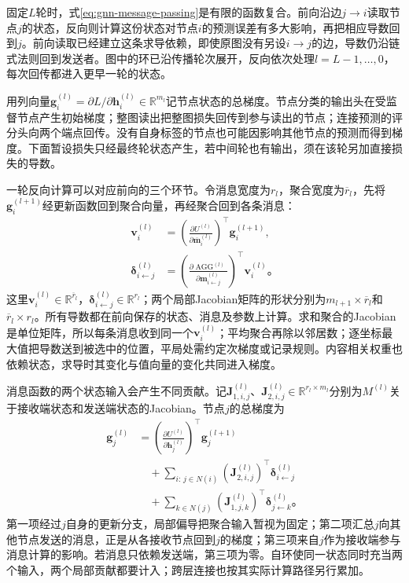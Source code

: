 固定$L$轮时，式\eqref{eq:gnn-message-passing}是有限的函数复合。前向沿边$j\to i$读取节点$j$的状态，反向则计算这份状态对节点$i$的预测误差有多大影响，再把相应导数回到$j$。前向读取已经建立这条求导依赖，即使原图没有另设$i\to j$的边，导数仍沿链式法则回到发送者。图中的环已沿传播轮次展开，反向依次处理$l=L-1,\ldots,0$，每次回传都进入更早一轮的状态。

用列向量$\bm{g}_i^{(l)}=\partial L/\partial\bm{h}_i^{(l)}\in\mathbb{R}^{m_l}$记节点状态的总梯度。节点分类的输出头在受监督节点产生初始梯度；整图读出把整图损失回传到参与读出的节点；连接预测的评分头向两个端点回传。没有自身标签的节点也可能因影响其他节点的预测而得到梯度。下面暂设损失只经最终轮状态产生，若中间轮也有输出，须在该轮另加直接损失的导数。

一轮反向计算可以对应前向的三个环节。令消息宽度为$r_l$，聚合宽度为$\overline r_l$，先将$\bm{g}_i^{(l+1)}$经更新函数回到聚合向量，再经聚合回到各条消息：
\begin{equation}
  \begin{aligned}
    \bm{v}_i^{(l)}
      &=\left(\frac{\partial U^{(l)}}
        {\partial\overline{\bm{m}}_i^{(l)}}\right)^{\top}
        \bm{g}_i^{(l+1)},\\
    \bm{\delta}_{i\leftarrow j}^{(l)}
      &=\left(\frac{\partial\operatorname{AGG}^{(l)}}
        {\partial\bm{m}_{i\leftarrow j}^{(l)}}\right)^{\top}
        \bm{v}_i^{(l)}\text{。}
  \end{aligned}
  \label{eq:gnn-message-adjoints}
\end{equation}
这里$\bm{v}_i^{(l)}\in\mathbb{R}^{\overline r_l}$，$\bm{\delta}_{i\leftarrow j}^{(l)}\in\mathbb{R}^{r_l}$；两个局部Jacobian矩阵的形状分别为$m_{l+1}\times\overline r_l$和$\overline r_l\times r_l$。所有导数都在前向保存的状态、消息及参数上计算。求和聚合的Jacobian是单位矩阵，所以每条消息收到同一个$\bm{v}_i^{(l)}$；平均聚合再除以邻居数；逐坐标最大值把导数送到被选中的位置，平局处需约定次梯度或记录规则。内容相关权重也依赖状态，求导时其变化与值向量的变化共同进入梯度。

消息函数的两个状态输入会产生不同贡献。记$\bm{J}_{1,i,j}^{(l)}$、$\bm{J}_{2,i,j}^{(l)}\in\mathbb{R}^{r_l\times m_l}$分别为$M^{(l)}$关于接收端状态和发送端状态的Jacobian。节点$j$的总梯度为
\begin{equation}
  \begin{aligned}
    \bm{g}_j^{(l)}
      &=\left(\frac{\partial U^{(l)}}
        {\partial\bm{h}_j^{(l)}}\right)^{\top}
        \bm{g}_j^{(l+1)}\\
      &\quad+\sum_{i:\,j\in N(i)}
        (\bm{J}_{2,i,j}^{(l)})^{\top}
        \bm{\delta}_{i\leftarrow j}^{(l)}\\
      &\quad+\sum_{k\in N(j)}
        (\bm{J}_{1,j,k}^{(l)})^{\top}
        \bm{\delta}_{j\leftarrow k}^{(l)}\text{。}
  \end{aligned}
  \label{eq:gnn-node-state-gradient}
\end{equation}
第一项经过$j$自身的更新分支，局部偏导把聚合输入暂视为固定；第二项汇总$j$向其他节点发送的消息，正是从各接收节点回到$j$的梯度；第三项来自$j$作为接收端参与消息计算的影响。若消息只依赖发送端，第三项为零。自环使同一状态同时充当两个输入，两个局部贡献都要计入；跨层连接也按其实际计算路径另行累加。

